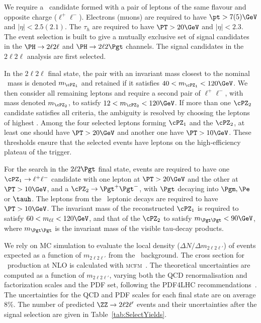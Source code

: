 We require a \cPZ\ candidate formed with a pair of leptons of the same 
flavour and  opposite charge ($\ell^+\ell^-$). Electrons (muons) are required to 
have $\pt > 7(5)\GeV$ and $|\eta|<2.5(2.1)$. 
The $\tau_h$ are required to have $\PT > 20 \GeV$ and $|\eta|<2.3$.
The event selection is built to give a mutually exclusive set of signal candidates 
in the  $\PH\rightarrow 2\ell 2\ell$ and $\PH\rightarrow 2\ell2\Pgt$ channels. 
The signal candidates in the $2\ell 2\ell$ analysis are first selected. 

In the $2\ell2\ell$ final state, 
the pair with an invariant mass closest to the nominal \cPZ\  mass is denoted
$m_{\cPZ_1}$ and retained if it satisfies $40 < m_{\cPZ_1} < 120\GeV$.
We then consider all remaining leptons and require a second pair of $\ell^+\ell^-$,
with mass denoted $m_{\cPZ_2}$, to satisfy $12 < m_{\cPZ_2} < 120\GeV$.
If more than one ${\cPZ_2}$ candidate satisfies all criteria, the ambiguity
is resolved by choosing the leptons of highest \PT.
Among the four selected leptons forming $\cPZ_1$ and the $\cPZ_2$,
at least one should have $\PT > 20 \GeV$ and another one 
have $\PT > 10 \GeV$.
These \PT thresholds ensure that the selected events have leptons 
on the high-efficiency plateau of the trigger.

For the search in the $2\ell2\Pgt$ final state, events are required to have one 
$\cPZ_1 \to \ell^+\ell^-$ candidate with one lepton at $\PT > 20 \GeV$ and the other at
$\PT > 10 \GeV$,
and a  $\cPZ_2 \to \Pgt^+\Pgt^-$, with $\Pgt$ decaying into $\Pgm, \Pe$ or $\tauh$.
The leptons from the \Pgt\ leptonic decays are required to have $\PT > 10 \GeV$. 
The invariant mass of the reconstructed $\cPZ_1$ is required to satisfy
$ 60 < m_{\ell\ell} < 120\GeV$, and that of the $\cPZ_2$ to satisfy
$ m_{\Pgt\Pgt} < 90\GeV$, where $m_{\Pgt\Pgt}$ is the invariant mass of the visible 
tau-decay products.

We rely on MC simulation to evaluate the local density ($\Delta N /
\Delta m_{2\ell2\ell'}$) of events expected as a function of 
$m_{2\ell2\ell'}$ from the \cPZ\cPZ\ background.  
The cross section for \ZZ\
production at NLO is calculated with
\textsc{mcfm}~\cite{MCFM,Campbell:1999ah,Campbell:2011bn}.
The theoretical uncertainties are computed as a function of $m_{2\ell2\ell'}$, 
varying both the QCD renormalisation
and factorization scales and the PDF set, following the PDF4LHC
recommendations~\cite{Botje:2011sn,Alekhin:2011sk,Lai:2010vv,Martin:2009iq,Ball:2011mu}.
The uncertainties for the QCD and PDF scales for each final state are on average 8\%.
The number of predicted $\ZZ \to 2\ell 2\ell'$  events and their uncertainties after the signal
selection are given in Table~\ref{tab:SelectYields}.

